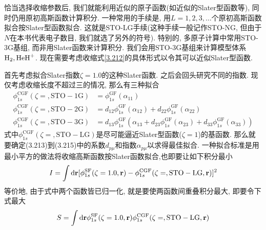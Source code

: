 恰当选择收缩参数后, 我们就能利用近似的原子\hft 函数(如近似的Slater型函数等), 同时仍用原初高斯函数计算积分. 一种常用的手续是, 用$L=1,2,3,\ldots$个原初高斯函数拟合按Slater型函数拟合. 这就是STO-LG手续(这种手续一般记作STO-NG, 但由于$N$在本书代表电子数目, 我们就选了另外的符号). 特别的, 多原子计算中常用STO-3G基组, 而非用Slater函数来计算积分. 我们会用STO-3G基组来计算模型体系$\mathrm{H}_2,\mathrm{HeH}^+$. 现在需要考虑收缩式\eqref{3.212}的具体形式以令其可以近似Slater型函数.

首先考虑拟合Slater指数$\zeta=1.0$的这种Slater函数. 之后会回头研究不同的指数. 现仅考虑收缩长度不超过三的情况, 那么有三种拟合
\begin{align}
\phi_{1s}^\mathrm{CGF}(\zeta=, \mathrm{STO-1G}) &= \phi_{1s}^\mathrm{GF}(\alpha_{11})\\
\phi_{1s}^\mathrm{CGF}(\zeta=, \mathrm{STO-2G}) &= d_{12}\phi_{1s}^\mathrm{GF}(\alpha_{12}) + d_{22}\phi_{1s}^\mathrm{GF}(\alpha_{22})\\
\phi_{1s}^\mathrm{CGF}(\zeta=, \mathrm{STO-3G}) &= d_{13}\phi_{1s}^\mathrm{GF}(\alpha_{13}+ d_{23}\phi_{1s}^\mathrm{GF}(\alpha_{23}) + d_{33}\phi_{1s}^\mathrm{GF}(\alpha_{33}))
\end{align}
式中$\phi_{1s}^\mathrm{CGF}(\zeta=, \mathrm{STO-LG})$是尽可能逼近Slater型函数($\zeta=1$)的基函数. 那么就要确定(3.213)到(3.215)中的系数$d_{p\mu}$和指数$\alpha_{p\mu}$以求得最佳拟合. 一种拟合标准是用最小平方的做法将收缩高斯函数按Slater函数拟合,也即要让如下积分最小
\begin{align}
I = \int\dd{r}[\phi_{1s}^\mathrm{SF}(\zeta=1.0,\bfr) - \phi_{1s}^\mathrm{CGF}(\zeta=, \mathrm{STO-LG},\bfr)]^2
\end{align}
等价地, 由于式中两个函数皆已归一化, 就是要使两函数间重叠积分最大, 即要令下式最大
\begin{align}
S = \int\dd{r}\phi_{1s}^\mathrm{SF}(\zeta=1.0,\bfr)\phi_{1s}^\mathrm{CGF}(\zeta=, \mathrm{STO-LG},\bfr)
\end{align}


